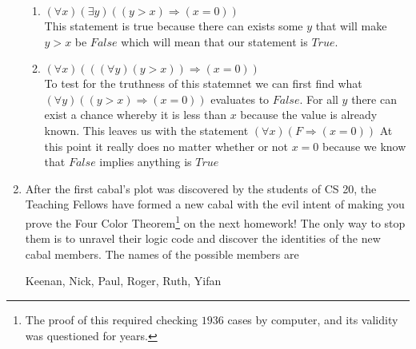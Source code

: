 \documentclass[12pt]{article}
\begin{document}
\begin{enumerate}
\begin{enumerate}
\item $(\forall x)(\exists y) ((y>x) \Rightarrow (x=0))$ \\
This statement is true because there can exists some $y$ that will make $y > x$ be $False$ which will mean that our statement is $True$.
\item $(\forall x)(((\forall y)(y>x)) \Rightarrow (x=0))$ \\
To test for the truthness of this statemnet we can first find what $(\forall y) ((y>x) \Rightarrow ( x = 0))$ evaluates to $False$. For all $y$ there can exist a chance whereby it is less than $x$ because the value is already known. This leaves us with the statement $(\forall x)(F \Rightarrow (x = 0))$ At this point it really does no matter whether or not $x = 0$ because we know that $False$ implies anything is $True$
\end{enumerate}

\item After the first cabal's plot was discovered by the students of CS 20, the Teaching Fellows have formed a new cabal with the evil intent of making you prove the Four Color Theorem\footnote{The proof of this required checking $1936$ cases by computer, and its validity was questioned for years.} on the next homework! The only way to stop them is to unravel their logic code and discover the identities of the new cabal members. The names of the possible members are \\
\begin{center} Keenan, Nick, Paul, Roger, Ruth, Yifan \end{center}


\end{enumerate}
\end{document}
